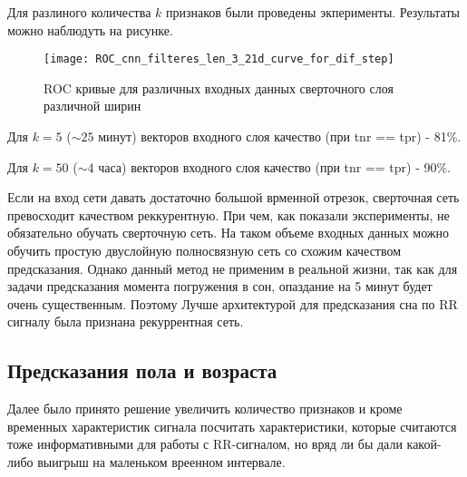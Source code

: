 Для разлиного количества $k$ признаков были проведены экперименты. Результаты можно наблюдуть на рисунке.

\begin{figure}[h!]
	\begin{center}
		\texttt{[image: ROC\_cnn\_filteres\_len\_3\_21d\_curve\_for\_dif\_step]}
		\caption{ROC кривые для различных входных данных сверточного слоя различной ширин}
		\label{ris:roc_cnn}
	\end{center}
\end{figure}

Для $k = 5 $  ($\sim 25$ минут) векторов входного слоя качество (при tnr == tpr) - 81\%.

Для $k = 50$ ($\sim 4$ часа) векторов входного слоя качество (при tnr == tpr) - 90\%.

Если на вход сети давать достаточно большой врменной отрезок, сверточная сеть превосходит качеством реккурентную. При чем, как показали эксперименты, не обязательно обучать сверточную сеть. На таком объеме входных данных можно обучить простую двуслойную полносвязную сеть со схожим качеством предсказания. Однако данный метод не применим в реальной жизни, так как для задачи предсказания момента погружения в сон, опаздание на 5 минут будет очень существенным. Поэтому Лучше архитектурой для предсказания сна по RR сигналу была признана рекуррентная сеть.
 

\subsection{Предсказания пола и возраста}
Далее было принято решение увеличить количество признаков и кроме временных характеристик сигнала посчитать характеристики, которые считаются тоже информативными для работы с RR-сигналом, но вряд ли бы дали какой-либо выигрыш на маленьком вреенном интервале.


